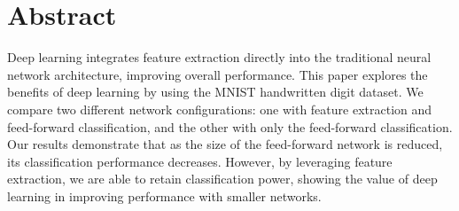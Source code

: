\chapter*{Abstract}
Deep learning integrates feature extraction directly into the traditional neural network architecture, improving overall performance. This paper explores the benefits of deep learning by using the MNIST handwritten digit dataset. We compare two different network configurations: one with feature extraction and feed-forward classification, and the other with only the feed-forward classification. Our results demonstrate that as the size of the feed-forward network is reduced, its classification performance decreases. However, by leveraging feature extraction, we are able to retain classification power, showing the value of deep learning in improving performance with smaller networks.
